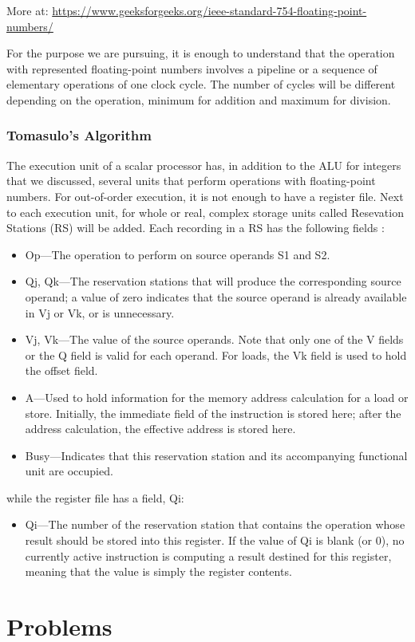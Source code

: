 More at: \url{https://www.geeksforgeeks.org/ieee-standard-754-floating-point-numbers/}

For the purpose we are pursuing, it is enough to understand that the operation with represented floating-point numbers involves a pipeline or a sequence of elementary operations of one clock cycle. The number of cycles will be different depending on the operation, minimum for addition and maximum for division.

\subsubsection{Tomasulo's Algorithm}

The execution unit of a scalar processor has, in addition to the ALU for integers that we discussed, several units that perform operations with floating-point numbers. For out-of-order execution, it is not enough to have a register file. Next to each execution unit, for whole or real, complex storage units called Resevation Stations (RS) will be added. Each recording in a RS has the following fields \citep{Patterson19}:
\begin{itemize}
    \item Op—The operation to perform on source operands S1 and S2.
\item Qj, Qk—The reservation stations that will produce the corresponding source
operand; a value of zero indicates that the source operand is already available
in Vj or Vk, or is unnecessary.
\item Vj, Vk—The value of the source operands. Note that only one of the V fields or
the Q field is valid for each operand. For loads, the Vk field is used to hold the
offset field.
\item A—Used to hold information for the memory address calculation for a load or
store. Initially, the immediate field of the instruction is stored here; after the
address calculation, the effective address is stored here.
\item Busy—Indicates that this reservation station and its accompanying functional
unit are occupied.
\end{itemize}
while the register file has a field, Qi:
\begin{itemize}
    \item Qi—The number of the reservation station that contains the operation whose
result should be stored into this register. If the value of Qi is blank (or 0), no currently active instruction is computing a result destined for this register, meaning that the value is simply the register contents.
\end{itemize}

\section{Problems}

\subsection{}

\subsection{}
